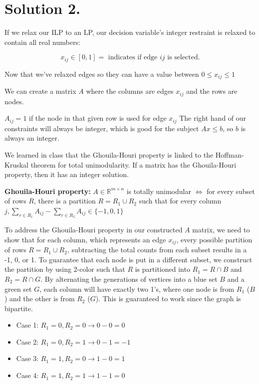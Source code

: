 \documentclass[11pt]{article}
\begin{document}
\section{Solution 2.}
\label{sec:orge9d44b0}

If we relax our ILP to an LP, our decision variable's integer restraint is relaxed to contain all real numbers:


\[ x_{ij} \in [0,1] = \text{ indicates if edge } ij \text{ is selected.} \]

Now that we've relaxed edges so they can have a value between \(0 \leq x_{ij} \leq 1\)

We can create a matrix \(A\) where the columns are edges \(x_{ij}\) and the rows are nodes.

\(A_{ij} = 1\) if the node in that given row is used for edge \(x_{ij}\)
The right hand of our constraints will always be integer, which is good for the subject \(A x \leq b\), so \(b\) is always an integer.



We learned in class that the Ghouila-Houri property is linked to the Hoffman-Kruskal theorem for total unimodularity. If a matrix has the Ghouila-Houri property, then it has an integer solution.

\textbf{\textbf{Ghouila-Houri property:}} \(A \in \mathbb{R}^{m \times n}\) is totally unimodular \(\iff\) for every subset of rows \(R\), there is a partition \(R = R_1 \cup R_2\) such that for every column \(j, \sum_{r \in R_1} A_{ij} - \sum_{r \in R_2} A_{ij} \in \{-1, 0, 1 \}\)

To address the Ghouila-Houri property in our constructed \(A\) matrix, we need to show that for each column, which represents an edge \(x_{ij}\), every possible partition of rows \(R = R_1 \cup R_2\), subtracting the total counts from each subset results in a -1, 0, or 1.
To guarantee that each node is put in a different subset, we construct the partition by using 2-color such that \(R\) is partitioned into \(R_1 = R \cap B\) and \(R_2 = R \cap G\). By alternating the generations of vertices into a blue set \(B\) and a green set \(G\), each column will have exactly two 1's, where one node is from \(R_1\) (\(B\)) and the other is from \(R_2\) (\(G\)). This is guaranteed to work since the graph is bipartite.

\begin{itemize}
\item Case 1: \(R_1 = 0, R_2 = 0 \rightarrow 0 - 0 = 0\)
\item Case 2: \(R_1 = 0, R_2 = 1 \rightarrow 0 - 1 = -1\)
\item Case 3: \(R_1 = 1, R_2 = 0 \rightarrow 1 - 0 = 1\)
\item Case 4: \(R_1 = 1, R_2 = 1 \rightarrow 1 - 1 = 0\)
\end{itemize}
\end{document}
